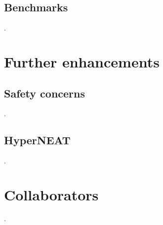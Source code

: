 \documentclass[11pt]{article}
\begin{document}
		\subsection{Benchmarks}
			.
	\newpage

	\section{Further enhancements}
		\subsection{Safety concerns}
			.
		\subsection{HyperNEAT}
			.
	\newline

	\section{Collaborators}
		.
	\newline

	\nocite{*}
	{\RaggedRight
		
		
	}
\end{document}
